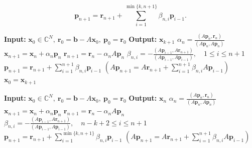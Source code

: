 \[\bm p_{n+1}=\bm r_{n+1}+\sum_{i=1}^{\min\{k,n+1\}}\beta_{n,i}\bm p_{i-1}.\]
\begin{algorithm}[H]\caption{}\label{alg:gcr-restarted}\begin{algorithmic}[1]
\Statex\textbf{Input:} $\bm x_0\in\mathbb C^N,\ \bm r_0=\bm b-A\bm x_0,\ \bm p_0=\bm r_0$
\Statex\textbf{Output:} $\bm x_{k+1}$
\State $\alpha_n=\frac{(A\bm p_n,\bm r_n)}{(A\bm p_n,A\bm p_n)}$
\State $\bm x_{n+1}=\bm x_n+\alpha_n\bm p_n$
\State $\bm r_{n+1}=\bm r_n-\alpha_nA\bm p_n$
\State $\beta_{n,i}=-\frac{(A\bm p_{i-1},A\bm r_{n+1})}{(A\bm p_{i-1},A\bm p_{i-1})},\quad1\le i\le n+1$
\State $\bm p_{n+1}=\bm r_{n+1}+\sum_{i=1}^{n+1}\beta_{n,i}\bm p_{i-1}$
\State $(A\bm p_{n+1}=A\bm r_{n+1}+\sum_{i=1}^{n+1}\beta_{n,i}A\bm p_{i-1})$
\EndFor\State $\bm x_0=\bm x_{k+1}$\State{}
\end{algorithmic}\end{algorithm}
\begin{algorithm}[H]\caption{}\label{alg:orthomin}\begin{algorithmic}[1]
\Statex\textbf{Input:} $\bm x_0\in\mathbb C^N,\ \bm r_0=\bm b-A\bm x_0,\ \bm p_0=\bm r_0$
\Statex\textbf{Output:} $\bm x_n$
\State $\alpha_n=\frac{(A\bm p_n,\bm r_n)}{(A\bm p_n,A\bm p_n)}$
\State $\bm x_{n+1}=\bm x_n+\alpha_n\bm p_n$
\State $\bm r_{n+1}=\bm r_n-\alpha_nA\bm p_n$
\State $\beta_{n,i}=-\frac{(A\bm p_{i-1},A\bm r_{n+1})}{(A\bm p_{i-1},A\bm p_{i-1})},\quad n-k+2\le i\le n+1$
\State $\bm p_{n+1}=\bm r_{n+1}+\sum_{i=1}^{\min\{k,n+1\}}\beta_{n,i}\bm p_{i-1}$
\State $(A\bm p_{n+1}=A\bm r_{n+1}+\sum_{i=1}^{n+1}\beta_{n,i}A\bm p_{i-1})$
\EndFor\end{algorithmic}\end{algorithm}
